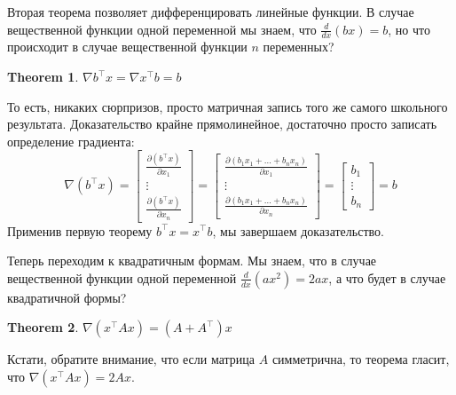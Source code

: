 \documentclass[notitlepage]{report}
\newtheorem{theorem}{Theorem}
\begin{document}
Вторая теорема позволяет дифференцировать линейные функции. В случае вещественной функции одной переменной мы знаем, что $\frac{d}{dx}(bx) = b$, но что происходит в случае вещественной функции $n$ переменных?
\begin{theorem}
$\nabla b^\top x = \nabla x^\top b = b$
\end{theorem}
То есть, никаких сюрпризов, просто матричная запись того же самого школьного результата. Доказательство крайне прямолинейное, достаточно просто записать определение градиента:
$$\nabla(b^\top x) = \begin{bmatrix}\frac{\partial (b^\top x)}{\partial x_1} \\ \vdots \\ \frac{\partial (b^\top x)}{\partial x_n} \end{bmatrix} = \begin{bmatrix}\frac{\partial (b_1 x_1 + \dots + b_n x_n)}{\partial x_1} \\ \vdots \\ \frac{\partial (b_1 x_1 + \dots + b_n x_n)}{\partial x_n} \end{bmatrix}
= \begin{bmatrix}b_1 \\ \vdots \\ b_n \end{bmatrix} = b$$
Применив первую теорему $b^\top x = x^\top b$, мы завершаем доказательство.

Теперь переходим к квадратичным формам. Мы знаем, что в случае вещественной функции одной переменной $\frac{d}{dx}(ax^2) = 2ax$, а что будет в случае квадратичной формы?
\begin{theorem}
$\nabla (x^\top A x) = (A+A^\top)x$
\end{theorem}
Кстати, обратите внимание, что если матрица $A$ симметрична, то теорема гласит, что $\nabla (x^\top A x) = 2Ax$.
\end{document}
